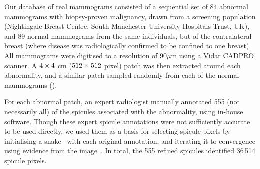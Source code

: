 \label{dataset_realmamm}
%
Our database of real mammograms consisted of a sequential set of 84 abnormal mammograms with biopsy-proven malignancy, drawn from a screening population (Nightingale Breast Centre, South Manchester University Hospitals Trust, UK), and 89 normal mammograms from the same individuals, but of the contralateral breast (where disease was radiologically confirmed to be confined to one breast). All mammograms were digitised to a resolution of $90 \mu\text{m}$ using a Vidar CADPRO scanner. A $4 \times 4$ cm ($512 \times 512$ pixel) patch was then extracted around each abnormality, and a similar patch sampled randomly from each of the normal mammograms ().

For each abnormal patch, an expert radiologist manually annotated 555 (not necessarily all) of the spicules associated with the abnormality, using in-house software. Though these expert spicule annotations were not sufficiently accurate to be used directly, we used them as a basis for selecting spicule pixels by initialising a snake~\cite{Kass_etal_IJCV88} with each original annotation, and iterating it to convergence using evidence from the  image~\cite{Muralidhar_etal_TMI10}. In total, the 555 refined spicules identified 36\,514 spicule pixels.